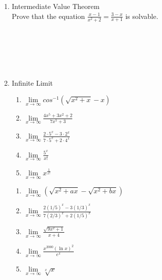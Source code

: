 \documentclass[12px]{article}
\begin{document}
\begin{enumerate}
\begin{enumerate}[(1)]
        \item Intermediate Value Theorem\\
        Prove that the equation $\frac{x-1}{x^2+2}=\frac{3-x}{x+1}$ is solvable.
        \\
        \\
        \\
        \\
        \\
        \\
        \item Infinite Limit
        \begin{multicols}{2}
            \begin{enumerate}
                \item $\lim\limits_{x\to\infty}cos^{-1}(\sqrt{x^2+x}-x)$\\
                \item $\lim\limits_{x\to\infty}\frac{4x^5+3x^2+2}{7x^5+3}$\\
                \item $\lim\limits_{x\to\infty}\frac{2\cdot5^x-3\cdot2^x}{7\cdot5^x+2\cdot4^x}$\\
                \item $\lim\limits_{x\to\infty}\frac{5^x}{x!}$\\
                \item $\lim\limits_{x\to\infty}x^{\frac{1}{x!}}$\\
            \end{enumerate}
            \begin{enumerate}
                \item $\lim\limits_{x\to\infty}(\sqrt{x^2+ax}-\sqrt{x^2+bx})$\\
                \item $\lim\limits_{x\to\infty}\frac{2(1/5)^x-3(1/3)^x}{7(2/3)^x+2(1/5)^x}$\\
                \item $\lim\limits_{x\to\infty}\frac{\sqrt{9x^2+1}}{x+4}$\\
                \item $\lim\limits_{x\to\infty}\frac{x^{2000}(\ln{x})^2}{e^x}$\\
                \item $\lim\limits_{x\to\infty}\sqrt[x]{x}$\\
            \end{enumerate}
        \end{multicols}


\end{enumerate}
\end{enumerate}
\end{document}
